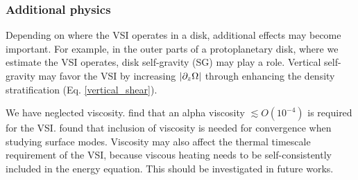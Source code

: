 \subsubsection{Additional physics} 
Depending on where the VSI operates in a
disk, additional effects may become important. For example, in the
outer parts of a protoplanetary disk, where we estimate the VSI 
operates, disk self-gravity (SG) may play a role. Vertical
self-gravity may favor the VSI by increasing $|\partial_z\Omega|$ through
enhancing the density stratification 
(Eq. \ref{vertical_shear}). %

We have neglected viscosity.  find that an alpha
viscosity $\lesssim O(10^{-4})$ is required for the
VSI.  found that inclusion of viscosity is needed for 
convergence when studying surface modes. %
Viscosity may also affect the
thermal timescale requirement of the VSI, because viscous heating
needs to be self-consistently included in the energy equation. This
should be investigated in future works.   



